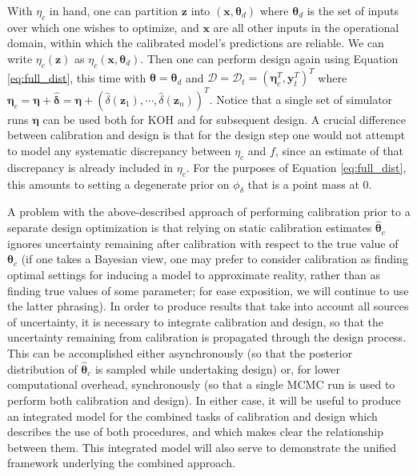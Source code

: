 \documentclass[10pt]{asme2ej}
\begin{document}
%
With $\eta_c$ in hand, one can partition $\mathbf z$ into $(\mathbf x,\boldsymbol\theta_d)$ where $\boldsymbol\theta_d$ is the set of inputs over which one wishes to optimize, and $\mathbf x$ are all other inputs in the operational domain, within which the calibrated model's predictions are reliable.
%
We can write $\eta_c(\mathbf z)$ as $\eta_c(\mathbf x,\boldsymbol\theta_d)$.
%
Then one can perform design again using Equation \eqref{eq:full_dist}, this time with $\boldsymbol\theta = \boldsymbol\theta_d$ and $\mathcal D = \mathcal D_t = (\boldsymbol\eta_c^T,\mathbf y_t^T)^T$ where $\boldsymbol\eta_c = \boldsymbol \eta+ \widehat{\boldsymbol \delta}= \boldsymbol \eta+ (\widehat\delta(\mathbf z_1), \cdots, \widehat\delta(\mathbf z_n))^T.$
%
Notice that a single set of simulator runs $\boldsymbol\eta$ can be used both for KOH and for subsequent design.
%
A crucial difference between calibration and design is that for the design step one would not attempt to model any systematic discrepancy between $\eta_c$ and $f$, since an estimate of that discrepancy is already included in $\eta_c$.
%
For the purposes of Equation \eqref{eq:full_dist}, this amounts to setting a degenerate prior on $\phi_\delta$ that is a point mass at 0.
%

%
A problem with the above-described approach of performing calibration prior to a separate design optimization is that relying on static calibration estimates $\widehat{\boldsymbol \theta}_c$ ignores uncertainty remaining after calibration with respect to the true value of $\boldsymbol\theta_c$ (if one takes a Bayesian view, one may prefer to consider calibration as finding optimal settings for inducing a model to approximate reality, rather than as finding true values of some parameter; for ease exposition, we will continue to use the latter phrasing).
%
In order to produce results that take into account all sources of uncertainty, it is necessary to integrate calibration and design, so that the uncertainty remaining from calibration is propagated through the design process.
%
This can be accomplished either asynchronously (so that the posterior distribution of $\widehat{\boldsymbol\theta}_c$ is sampled while undertaking design) or, for lower computational overhead, synchronously (so that a single MCMC run is used to perform both calibration and design).
%
In either case, it will be useful to produce an integrated model for the combined tasks of calibration and design which describes the use of both procedures, and which makes clear the relationship between them.
%
This integrated model will also serve to demonstrate the unified framework underlying the combined approach.
%
\end{document}
